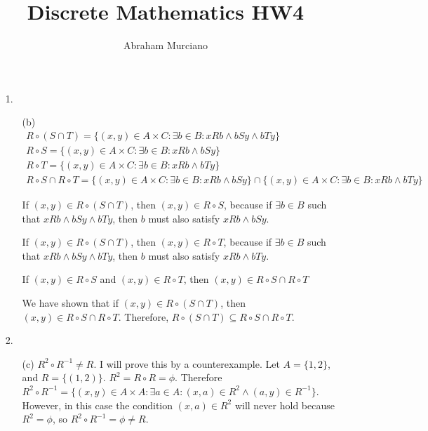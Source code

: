 \documentclass[fleqn]{article}
\title{Discrete Mathematics HW4}
\author{Abraham Murciano}
\begin{document}
\maketitle

\begin{enumerate}

	\item[1.]
	\begin{enumerate}
		\item[(b)]
		\begin{gather*}
			R \circ (S \cap T) = \{(x, y) \in A \times C : \exists b \in B : xRb \land bSy \land bTy\} \\
			R \circ S = \{(x, y) \in A \times C : \exists b \in B : xRb \land bSy\} \\
			R \circ T = \{(x, y) \in A \times C : \exists b \in B : xRb \land bTy\} \\
			R \circ S \cap R \circ T = \{(x, y) \in A \times C : \exists b \in B : xRb \land bSy\} \cap \{(x, y) \in A \times C : \exists b \in B : xRb \land bTy\}
		\end{gather*}

		If \((x, y) \in R \circ (S \cap T)\), then \((x, y) \in R \circ S\), because if \(\exists b \in B\) such that \(xRb \land bSy \land bTy\), then \(b\) must also satisfy \(xRb \land bSy\).

		If \((x, y) \in R \circ (S \cap T)\), then \((x, y) \in R \circ T\), because if \(\exists b \in B\) such that \(xRb \land bSy \land bTy\), then \(b\) must also satisfy \(xRb \land bTy\).

		If \((x, y) \in R \circ S\) and \((x, y) \in R \circ T\), then \((x, y) \in R \circ S \cap R \circ T\)

		We have shown that if \((x, y) \in R \circ (S \cap T)\), then \((x, y) \in R \circ S \cap R \circ T\). Therefore, \(R \circ (S \cap T) \subseteq R \circ S \cap R \circ T\).
	\end{enumerate}

    \item[2.]
	\begin{enumerate}
		\item[(c)]
		\(R^2 \circ R^{-1} \neq R\). I will prove this by a counterexample. Let \(A = \{1, 2\}\), and \(R = \{(1, 2)\}\). \(R^2 = R \circ R = \phi\). Therefore \(R^2 \circ R^{-1} = \{(x, y) \in A \times A : \exists a \in A : (x, a) \in R^2 \land (a, y) \in R^{-1}\}\). However, in this case the condition \((x, a) \in R^2\) will never hold because \(R^2 = \phi\), so \(R^2 \circ R^{-1} = \phi \neq R\).
	\end{enumerate}


\end{enumerate}
\end{document}
